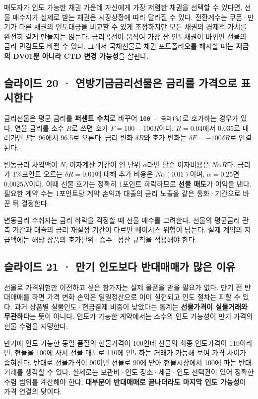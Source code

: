 \documentclass[11pt,a4paper]{article}
\begin{document}
매도자가 인도 가능한 채권 가운데 자신에게 가장 저렴한 채권을 선택할 수 있다면, 선물 매수자가 실제로 받는 채권은 시장상황에 따라 달라질 수 있다. 전환계수는 쿠폰·만기가 다른 채권의 인도대금을 비교할 수 있게 조정하지만 모든 채권의 경제적 가치를 완전히 같게 만들지는 않는다. 금리곡선이 움직여 가장 싼 인도채권이 바뀌면 선물의 금리 민감도도 바뀔 수 있다. 그래서 국채선물로 채권 포트폴리오를 헤지할 때는 \textbf{지금의 DV01뿐 아니라 CTD 변경 가능성}을 살핀다.\par

\subsection{슬라이드 20 · 연방기금금리선물은 금리를 가격으로 표시한다}
금리선물은 평균 금리를 \textbf{퍼센트 수치}로 바꾸어 \texttt{100 - 금리(\%)}로 호가하는 경우가 있다. 연율 금리를 소수 $R$로 쓰면 호가 $F=100-100R$이다. $R=0.04$에서 $0.035$로 내려가면 $F$는 96에서 96.5로 오른다. 금리 변화 $\delta R$와 호가 변화는 $\delta F=-100\delta R$로 연결된다.\par

변동금리 차입액이 $N$, 이자계산 기간이 연 단위 $\alpha$라면 단순 이자비용은 $N\alpha R$다. 금리가 1\%포인트 오르는 $\delta R=0.01$에 대해 추가 비용은 $N\alpha(0.01)$이며, $\alpha=0.25$면 $0.0025N$이다. 이때 선물 호가는 정확히 1포인트 하락하므로 \textbf{선물 매도}가 이익을 낸다. 필요한 계약 수는 1포인트당 계약 손익과 대출의 금리 노출을 같은 통화·기간으로 바꾼 뒤 결정한다.\par

변동금리 수취자는 금리 하락을 걱정할 때 선물 매수를 고려한다. 선물의 평균금리 관측 기간과 대출의 금리 재설정 기간이 다르면 베이시스 위험이 남는다. 실제 계약의 지급액에는 해당 상품의 호가단위·승수·정산 규칙을 적용해야 한다.\par

\subsection{슬라이드 21 · 만기 인도보다 반대매매가 많은 이유}
선물로 가격위험만 이전하고 싶은 참가자는 실제 물품을 받을 필요가 없다. 만기 전 반대매매를 하면 가격 변화 손익은 일일정산으로 이미 실현되고 인도 절차는 피할 수 있다. 과거 상품별 실물인도·현금결제 비중이 낮았다는 통계는 \textbf{선물가격이 실물거래와 무관하다}는 뜻이 아니다. 인도가 가능한 계약에서는 소수의 인도 가능성이 만기 가격의 현물 수렴을 지탱한다.\par

만기에 인도 가능한 동일 품질의 현물가격이 100인데 선물의 최종 인도가격이 110이라면, 현물을 100에 사서 선물 매도로 110에 인도하는 거래가 가능해 보여 가격 차이가 좁혀진다. 반대로 선물가격이 90이면 선물로 90에 받아 현물시장에서 100에 파는 반대 거래를 생각할 수 있다. 실제로는 보관비·인도 장소·세금·인도 선택권이 있어 정확한 수렴 범위를 계산해야 한다. \textbf{대부분이 반대매매로 끝나더라도 마지막 인도 가능성}이 가격 연결의 닻이다.\par
\end{document}
